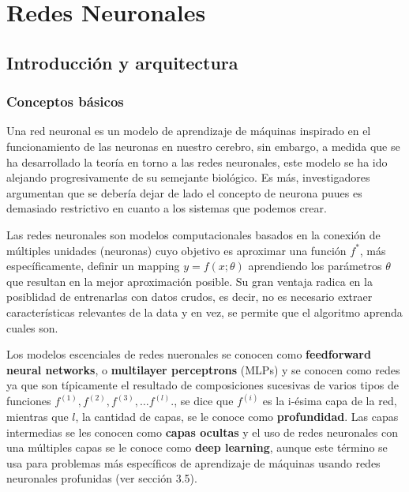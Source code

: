 
\newpage
\section{Redes Neuronales}

\subsection{Introducción y arquitectura}

\subsubsection{Conceptos básicos}

Una red neuronal es un modelo de aprendizaje de máquinas inspirado en el funcionamiento de las neuronas en nuestro cerebro, sin embargo, a medida que se ha desarrollado la teoría en torno a las redes neuronales, este modelo se ha ido alejando progresivamente de su semejante biológico. Es más, investigadores argumentan que se debería dejar de lado el concepto de neurona puues es demasiado restrictivo en cuanto a los sistemas que podemos crear. 

Las redes neuronales son modelos computacionales basados en la conexión de múltiples unidades (neuronas) cuyo objetivo es aproximar una función $f^{*}$, más específicamente, definir un mapping $y = f(x;\theta)$ aprendiendo los parámetros $\theta$ que resultan en la mejor aproximación posible. Su gran ventaja radica en la posiblidad de entrenarlas con datos crudos, es decir, no es necesario extraer características relevantes de la data y en vez, se permite que el algoritmo aprenda cuales son. 

Los modelos escenciales de redes nueronales se conocen como \textbf{feedforward neural networks}, o \textbf{multilayer perceptrons} (MLPs) y se conocen como redes ya que son típicamente el resultado de composiciones sucesivas de varios tipos de funciones $f^{(1)},f^{(2)},f^{(3)}, \dots f^{(l)} .$, se dice que $f^{(i)}$ es la i-ésima capa de la red, mientras que $l$, la cantidad de capas, se le conoce como \textbf{profundidad}. Las capas intermedias se les conocen como \textbf{capas ocultas} y el uso de redes neuronales con una múltiples capas se le conoce como \textbf{deep learning}, aunque este término se usa para problemas más específicos de aprendizaje de máquinas usando redes neuronales profunidas (ver sección 3.5).

